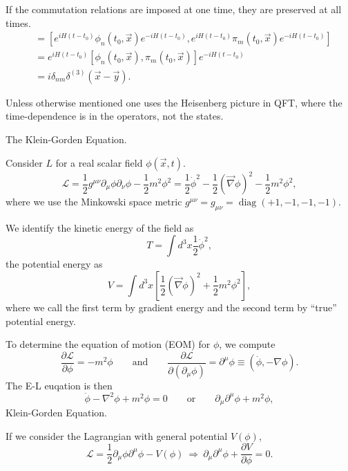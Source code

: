 \begin{remark}
    If the commutation relations are imposed at one time, they are preserved at all times.
        \begin{align*}
            [\phi_n(t, \vec{x}), \pi_m(t, \vec{x})] &= [e^{iH(t-t_0)}\phi_n(t_0, \vec{x})e^{-iH(t-t_0)}, e^{iH(t-t_0)} \pi_m(t_0, \vec{x})e^{-iH(t-t_0)}]\\
                &=e^{iH(t-t_0)}[ \phi_n(t_0, \vec{x}), \pi_m(t_0, \vec{x})] e^{-iH(t-t_0)}\\
                &= i \delta_{nm} \delta^{(3)} (\vec{x}-\vec{y}).
        \end{align*}

    \qquad Unless otherwise mentioned one uses the Heisenberg picture in QFT, where the time-dependence is in the operators, not the states.
\end{remark}

\begin{example} The Klein-Gorden Equation.

    \qquad Consider $L$ for a real scalar field $\phi(\vec{x},t)$.
        $$\mathcal{L}= \frac{1}{2}g^{\mu \nu} \partial_\mu \phi \partial_\nu \phi - \frac{1}{2}m^2\phi^2 = \frac{1}{2} \dot{\phi}^2 - \frac{1}{2}(\vec{\nabla} \phi)^2 - \frac{1}{2}m^2 \phi^2,$$
where we use the Minkowski space metric $g^{\mu \nu}= g_{\mu \nu}= \operatorname{diag}(+1, -1, -1, -1)$.

    \qquad We identify the kinetic energy of the field as 
            $$T= \int d^3 x \frac{1}{2} \dot{\phi}^2,$$
    the potential energy as
            $$V= \int d^3 x [\frac{1}{2}(\vec{\nabla} \phi)^2 + \frac{1}{2}m^2 \phi^2],$$
    where we call the first term by gradient energy and the second term by ``true'' potential energy.

    \qquad To determine the equation of motion (EOM) for $\phi$, we compute
        $$\frac{\partial \mathcal{L}}{\partial \phi} =-m^2 \phi \qquad \text{and} \qquad \frac{\partial \mathcal{L}}{\partial (\partial_\mu \phi)}=\partial^\mu \phi \equiv (\dot{\phi}, - \nabla \phi).$$
The E-L euqation is then
        $$\ddot{\phi}- \nabla^2 \phi + m^2 \phi=0 \qquad \text{or} \qquad \partial_\mu \partial^\mu \phi + m^2 \phi,$$
Klein-Gorden Equation.

    \qquad If we consider the Lagrangian with general potential $V(\phi)$,
        $$\mathcal{L}= \frac{1}{2}\partial_\mu \phi \partial^\mu \phi - V(\phi) \ \Rightarrow \ \partial_\mu \partial^\mu \phi + \frac{\partial V}{\partial \phi}=0.$$
\end{example}

